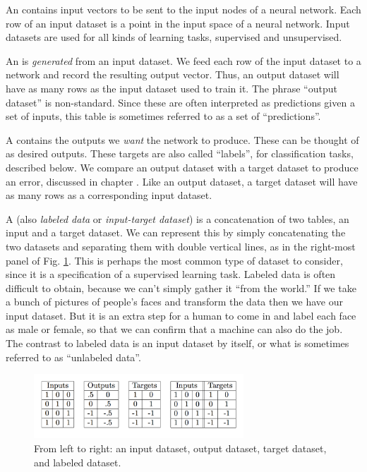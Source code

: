 An  contains input vectors to be sent to the input nodes of a neural network. Each row of an input dataset is a point in the input space of a neural network. Input datasets are used for all kinds of learning tasks, supervised and unsupervised. 

An  is \emph{generated} from an input dataset. We feed each row of the input dataset to a network and record the resulting output vector. Thus, an output dataset will have as many rows as the input dataset used to train it. The phrase ``output dataset'' is non-standard. Since these are often interpreted as predictions given a set of inputs, this table is sometimes referred to as a set  of ``predictions''. 

A  contains the outputs we \emph{want} the network to produce. These can be thought of as desired outputs. These targets are also called ``labels'', for classification tasks, described below. We compare an output dataset with a target dataset to produce an error, discussed in chapter . Like an output dataset, a target dataset will have as many rows as a corresponding input dataset. 

A  (also \emph{labeled data} or \emph{input-target dataset}) is a concatenation of two tables, an input and a target dataset. We can represent this by simply concatenating the two datasets and separating them with double vertical lines, as in the right-most panel of Fig. \ref{datasetTypes}. This is perhaps the most common type of dataset to consider, since it is a specification of a supervised learning task. Labeled data is often difficult to obtain, because we can't simply gather it ``from the world.''  If we take a bunch of pictures of people's faces and transform the data then we have our input dataset. But it is an extra step for a human to come in and label each face as male or female, so that we can confirm that a machine can also do the job. The contrast to labeled  data  is an input dataset by itself, or what is sometimes referred to as ``unlabeled data''. 

\begin{figure}[h]
\centering
\includegraphics[width=0.7\textwidth]{./images/datasetTypes.png}
\caption[Jeff Yoshimi.]{From left to right: an input dataset, output dataset, target dataset, and labeled dataset.}
\label{datasetTypes}
\end{figure}

